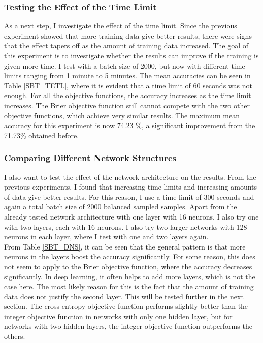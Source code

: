 \subsubsection{Testing the Effect of the Time Limit}
As a next step, I investigate the effect of the time limit. Since the previous experiment showed that more training data give better results, there were signs that the effect tapers off as the amount of training data increased. The goal of this experiment is to investigate whether the results can improve if the training is given more time. I test with a batch size of 2000, but now with different time limits ranging from 1 minute to 5 minutes. The mean accuracies can be seen in Table \ref{SBT_TETL}, where it is evident that a time limit of 60 seconds was not enough. For all the objective functions, the accuracy increases as the time limit increases. The Brier objective function still cannot compete with the two other objective functions, which achieve very similar results. The maximum mean accuracy for this experiment is now 74.23 \%, a significant improvement from the 71.73\% obtained before.   



\subsubsection{Comparing Different Network Structures}
I also want to test the effect of the network architecture on the results. From the previous experiments, I found that increasing time limits and increasing amounts of data give better results. For this reason, I use a time limit of 300 seconds and again a total batch size of 2000 balanced sampled samples. Apart from the already tested network architecture with one layer with 16 neurons, I also try one with two layers, each with 16 neurons. I also try two larger networks with 128 neurons in each layer, where I test with one and two layers again. \\

\noindent From Table \ref{SBT_DNS}, it can be seen that the general pattern is that more neurons in the layers boost the accuracy significantly. For some reason, this does not seem to apply to the Brier objective function, where the accuracy decreases significantly. In deep learning, it often helps to add more layers, which is not the case here. The most likely reason for this is the fact that the amount of training data does not justify the second layer. This will be tested further in the next section. The cross-entropy objective function performs slightly better than the integer objective function in networks with only one hidden layer, but for networks with two hidden layers, the integer objective function outperforms the others. 

